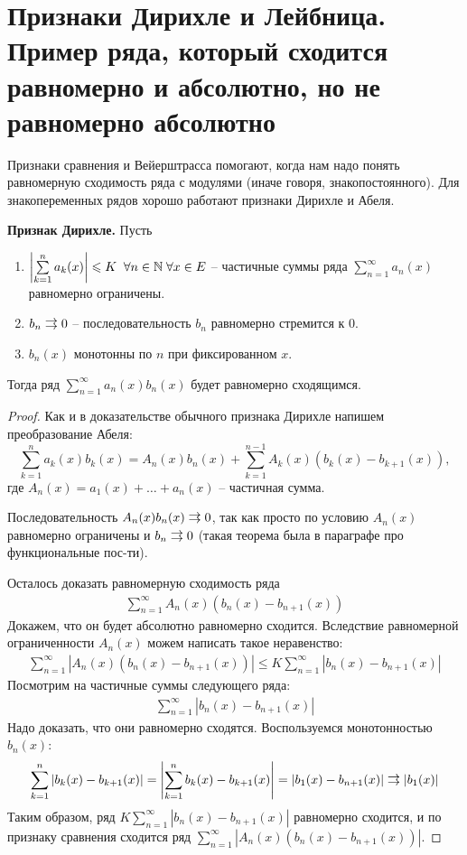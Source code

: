 \section{Признаки Дирихле и Лейбница. Пример ряда, который сходится равномерно и абсолютно, но не равномерно абсолютно}
Признаки сравнения и Вейерштрасса помогают, когда нам надо понять равномерную сходимость ряда с модулями (иначе говоря, знакопостоянного).
Для знакопеременных рядов хорошо работают признаки Дирихле и Абеля.

\textbf{Признак Дирихле.} 
Пусть \begin{enumerate}
    \item $\left| \sum\limits_{k = 1}^n a_k(x) \right| \leqslant K \;\; \forall n \in \mathbb{N} \; \forall x \in E$ -- частичные суммы ряда $\sum\limits_{n = 1}^\infty a_n(x)$ равномерно ограничены.
    \item $b_n \doublerightarrow 0$ -- последовательность $b_n$ равномерно стремится к 0.
    \item $b_n(x)$ монотонны по $n$ при фиксированном $x$.
\end{enumerate}
Тогда ряд $\sum\limits_{n = 1}^\infty a_n(x)b_n(x)$ будет равномерно сходящимся.

\begin{proof}
    Как и в доказательстве обычного признака Дирихле напишем преобразование Абеля: \[ \sum_{k=1}^n a_k(x)b_k(x) = A_n(x)b_n(x) + \sum_{k=1}^{n-1} A_k(x)(b_k(x) - b_{k+1}(x)), \]
    где $A_n(x) = a_1(x) + \dots + a_n(x)$ -- частичная сумма.

    \quad Последовательность $A_n(x)b_n(x) \doublerightarrow 0$, так как просто по условию $A_n(x)$ равномерно ограничены и $b_n \doublerightarrow 0$ (такая теорема была в параграфе про функциональные пос-ти).

    \quad Осталось доказать равномерную сходимость ряда 
    \begin{gather*}
        \sum\limits_{n = 1}^\infty A_n(x)(b_n(x) - b_{n+1}(x))
    \end{gather*}
    Докажем, что он будет абсолютно равномерно сходится.
    Вследствие равномерной ограниченности $A_n(x)$ можем написать такое неравенство: 
    \begin{gather*}
        \sum\limits_{n = 1}^\infty \left|A_n(x)(b_n(x) - b_{n+1}(x))\right| \leqslant K\sum\limits_{n = 1}^\infty \left|b_n(x) - b_{n+1}(x)\right|
    \end{gather*}
    Посмотрим на частичные суммы следующего ряда:
    \begin{gather*}
        \sum\limits_{n = 1}^\infty \left|b_n(x) - b_{n+1}(x)\right|
    \end{gather*}
    Надо доказать, что они равномерно сходятся.
    Воспользуемся монотонностью $b_n(x)$: \[ \sum\limits_{k = 1}^n \left|b_k(x) - b_{k+1}(x)\right| = \left|\sum\limits_{k = 1}^n b_k(x) - b_{k+1}(x)\right| = |b_1(x) - b_{n+1}(x)| \doublerightarrow |b_1(x)| \]
    \quad Таким образом, ряд $K\sum\limits_{n = 1}^\infty \left|b_n(x) - b_{n+1}(x)\right|$ равномерно сходится, и по признаку сравнения сходится ряд $\sum\limits_{n = 1}^\infty \left|A_n(x)(b_n(x) - b_{n+1}(x))\right|$.
\end{proof}

